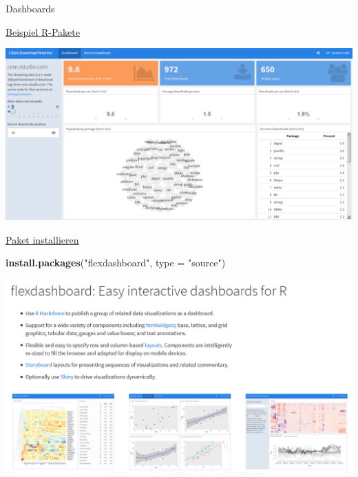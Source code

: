 \documentclass[ignorenonframetext,]{beamer}
\newenvironment{Shaded}{}{}
\newcommand{\KeywordTok}[1]{\textcolor[rgb]{0.00,0.44,0.13}{\textbf{{#1}}}}
\newcommand{\DataTypeTok}[1]{\textcolor[rgb]{0.56,0.13,0.00}{{#1}}}
\newcommand{\StringTok}[1]{\textcolor[rgb]{0.25,0.44,0.63}{{#1}}}
\newcommand{\NormalTok}[1]{{#1}}
\begin{document}
\begin{frame}[fragile]{Dashboards}

\begin{block}{\href{https://gallery.shinyapps.io/cran-gauge/}{Beispiel
R-Pakete}}

\includegraphics{./tex2pdf.9796/a853199d8c52109309acb7b49e363481b04e7192.png}

\end{block}

\begin{block}{\href{https://blog.rstudio.org/2016/05/17/flexdashboard-easy-interactive-dashboards-for-r/}{Paket
installieren}}

\begin{Shaded}
\begin{Highlighting}[]
\KeywordTok{install.packages}\NormalTok{(}\StringTok{"flexdashboard"}\NormalTok{, }\DataTypeTok{type =} \StringTok{"source"}\NormalTok{)}
\end{Highlighting}
\end{Shaded}

\includegraphics{./tex2pdf.9796/8a6432ad24b0155cd18f45caca068ee6de695690.png}

\end{block}


\end{frame}
\end{document}
